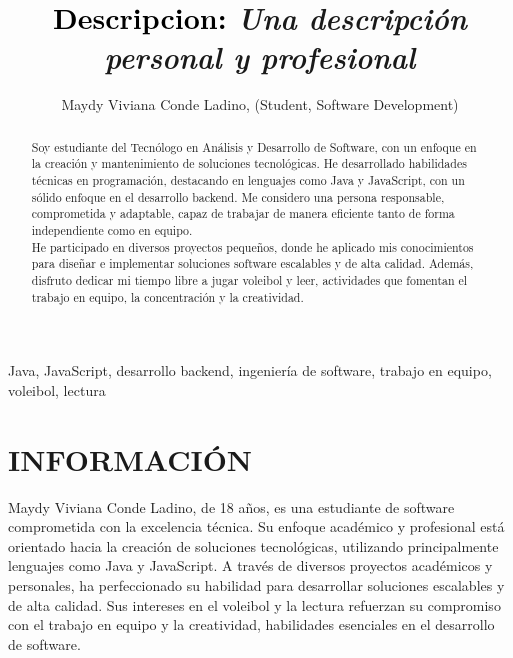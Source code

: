 \documentclass{IEEEoj-data}
\begin{document}
\title{\textcolor{black}{Descripcion:} \textcolor{ieeedata}{\textit{Una descripción personal y profesional}}}

\author{Maydy Viviana Conde Ladino, (Student, Software Development)}

\begin{abstract}
Soy estudiante del Tecn\'ologo en An\'alisis y Desarrollo de Software, con un enfoque en la creaci\'on y mantenimiento de soluciones tecnol\'ogicas. He desarrollado habilidades t\'ecnicas en programaci\'on, destacando en lenguajes como Java y JavaScript, con un s\'olido enfoque en el desarrollo backend. Me considero una persona responsable, comprometida y adaptable, capaz de trabajar de manera eficiente tanto de forma independiente como en equipo.\\

He participado en diversos proyectos peque\~nos, donde he aplicado mis conocimientos para dise\~nar e implementar soluciones software escalables y de alta calidad. Adem\'as, disfruto dedicar mi tiempo libre a jugar voleibol y leer, actividades que fomentan el trabajo en equipo, la concentraci\'on y la creatividad.
\end{abstract}

\begin{IEEEkeywords}
Java, JavaScript, desarrollo backend, ingeniería de software, trabajo en equipo, voleibol,
lectura
\end{IEEEkeywords}

\maketitle

\section*{INFORMACIÓN}

Maydy Viviana Conde Ladino, de 18 a\~nos, es una estudiante de software comprometida con la excelencia t\'ecnica. Su enfoque acad\'emico y profesional est\'a orientado hacia la creaci\'on de soluciones tecnol\'ogicas, utilizando principalmente lenguajes como Java y JavaScript. A trav\'es de diversos proyectos acad\'emicos y personales, ha perfeccionado su habilidad para desarrollar soluciones escalables y de alta calidad. Sus intereses en el voleibol y la lectura refuerzan su compromiso con el trabajo en equipo y la creatividad, habilidades esenciales en el desarrollo de software.
\end{document}
